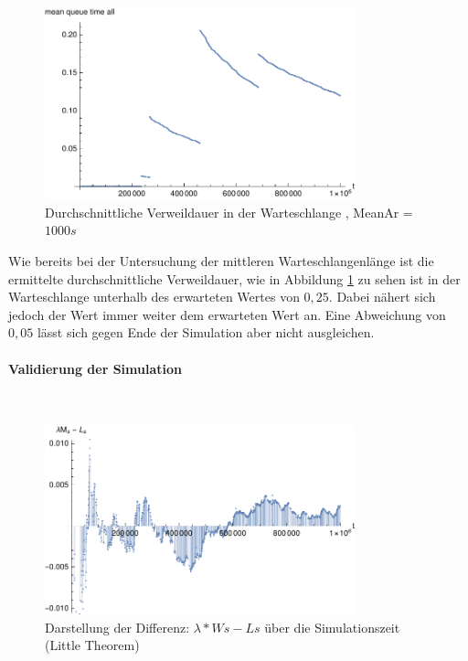 \begin{figure}[htpb]
	\centering
	\includegraphics[width=0.8\textwidth]{abbildungen/2_Phone_VIP/Arrival_1000_Serve_100_dur_1000000_Skip_0/MeanQueueTimeAll.pdf}
	\caption{Durchschnittliche Verweildauer in der Warteschlange , MeanAr = $1000s$}
	\label{fig:mean3QueueTime1000}
\end{figure} 

Wie bereits bei der Untersuchung der mittleren Warteschlangenlänge ist die ermittelte durchschnittliche Verweildauer, wie in Abbildung \ref{fig:mean3QueueTime1000} zu sehen ist in der Warteschlange unterhalb des erwarteten Wertes von $0,25$. Dabei nähert sich jedoch der Wert immer weiter dem erwarteten Wert an. Eine Abweichung von $0,05$ lässt sich gegen Ende der Simulation aber nicht ausgleichen.

\paragraph{Validierung der Simulation}
\\
\begin{figure}[htpb]
	\centering
	\includegraphics[width=0.8\textwidth]{abbildungen/2_Phone_VIP/Arrival_1000_Serve_100_dur_1000000_Skip_0/LittleSystem.pdf}
	\caption{Darstellung der Differenz: $\lambda * Ws - Ls$ über die Simulationszeit (Little Theorem)}
	\label{fig:Little3System1000}
\end{figure} 

